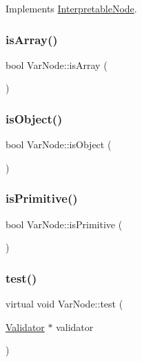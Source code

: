 Implements \hyperlink{classInterpretableNode_a9a466e7d65c4b323d2b96b4ac8396cd7}{Interpretable\+Node}.

\mbox{\label{classVarNode_ab433d17cf3b2002756931a4f74cc200a}} 
\subsubsection{\texorpdfstring{is\+Array()}{isArray()}}
{\footnotesize\ttfamily bool Var\+Node\+::is\+Array (\begin{DoxyParamCaption}{ }\end{DoxyParamCaption})}

\mbox{\label{classVarNode_ae0c6e834fe26f709f3e6bc859bc4384f}} 
\subsubsection{\texorpdfstring{is\+Object()}{isObject()}}
{\footnotesize\ttfamily bool Var\+Node\+::is\+Object (\begin{DoxyParamCaption}{ }\end{DoxyParamCaption})}

\mbox{\label{classVarNode_a0a735a87c57b56a0fbcb87ef3dd36c3f}} 
\subsubsection{\texorpdfstring{is\+Primitive()}{isPrimitive()}}
{\footnotesize\ttfamily bool Var\+Node\+::is\+Primitive (\begin{DoxyParamCaption}{ }\end{DoxyParamCaption})}

\mbox{\label{classVarNode_afaca674319775ae5e8a4fb0e5ec7b59f}} 
\subsubsection{\texorpdfstring{test()}{test()}}
{\footnotesize\ttfamily virtual void Var\+Node\+::test (\begin{DoxyParamCaption}\item[{\hyperlink{classValidator}{Validator} $\ast$}]{validator }\end{DoxyParamCaption})\hspace{0.3cm}{\ttfamily [virtual]}}



